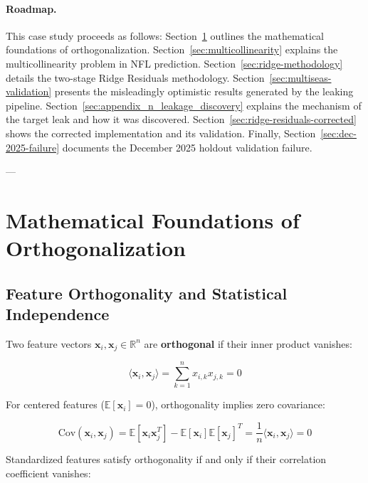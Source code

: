 \paragraph{Roadmap.}
This case study proceeds as follows: Section~\ref{sec:math-foundations} outlines the mathematical foundations of orthogonalization. Section~\ref{sec:multicollinearity} explains the multicollinearity problem in NFL prediction. Section~\ref{sec:ridge-methodology} details the two-stage Ridge Residuals methodology. Section~\ref{sec:multiseas-validation} presents the misleadingly optimistic results generated by the leaking pipeline. Section~\ref{sec:appendix_n_leakage_discovery} explains the mechanism of the target leak and how it was discovered. Section~\ref{sec:ridge-residuals-corrected} shows the corrected implementation and its validation. Finally, Section~\ref{sec:dec-2025-failure} documents the December 2025 holdout validation failure.

---

\section{Mathematical Foundations of Orthogonalization}
\label{sec:math-foundations}

\subsection{Feature Orthogonality and Statistical Independence}

Two feature vectors $\mathbf{x}_i, \mathbf{x}_j \in \mathbb{R}^n$ are \textbf{orthogonal} if their inner product vanishes:

\begin{equation}
\langle \mathbf{x}_i, \mathbf{x}_j \rangle = \sum_{k=1}^{n} x_{i,k} x_{j,k} = 0
\label{eq:orthogonality-def}
\end{equation}

For centered features ($\mathbb{E}[\mathbf{x}_i] = 0$), orthogonality implies zero covariance:

\begin{equation}
\text{Cov}(\mathbf{x}_i, \mathbf{x}_j) = \mathbb{E}[\mathbf{x}_i \mathbf{x}_j^T] - \mathbb{E}[\mathbf{x}_i] \mathbb{E}[\mathbf{x}_j]^T = \frac{1}{n} \langle \mathbf{x}_i, \mathbf{x}_j \rangle = 0
\end{equation}

Standardized features satisfy orthogonality if and only if their correlation coefficient vanishes:

